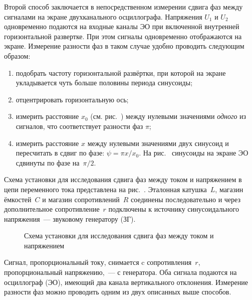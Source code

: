 Второй способ заключается в непосредственном измерении сдвига 
фаз между сигналами на экране двухканального осциллографа.
Напряжения $U_1$ и $U_2$ одновременно подаются на входные каналы ЭО
при включенной внутренней горизонтальной развертке. При этом
сигналы одновременно отображаются на экране.
Измерение разности фаз в таком случае удобно проводить следующим образом:
\begin{enumerate}[label=\arabic*),itemsep=0pt]
    \item подобрать частоту горизонтальной развёртки, при которой на экране 
    укладывается чуть больше половины периода синусоиды;
    \item отцентрировать горизонтальную ось;
    \item измерить расстояние $x_0$ (см. рис.~) между нулевыми значениями 
    \emph{одного} из сигналов, что соответствует разности фаз $\pi$;
    \item измерить расстояние $x$ между нулевыми значениями двух синусоид 
    и пересчитать в сдвиг по фазе: $\psi=\pi x/x_0$. На рис.~ 
    синусоиды на экране ЭО сдвинуты по фазе на~$\pi/2$.
\end{enumerate}

\experiment 
Схема установки для исследования сдвига фаз между током и напряжением 
в цепи переменного тока представлена на рис.~. Эталонная катушка~$L$, 
магазин ёмкостей~$C$ и магазин сопротивлений~$R$ соединены последовательно 
и через дополнительное сопротивление~$r$ подключены к источнику 
синусоидального напряжения~--- звуковому генератору (ЗГ).

\begin{figure}[hb]
    \centering\small
    \caption{Схема установки для исследования сдвига фаз между током и
        напряжением}
\end{figure}

Сигнал, пропорциональный току, снимается c сопротивления~$r$, 
пропорциональный напряжению,~--- с генератора. Оба сигнала подаются 
на осциллограф (ЭО), имеющий два канала вертикального 
отклонения. Измерение разности фаз можно проводить одним из двух
описанных выше способов.




